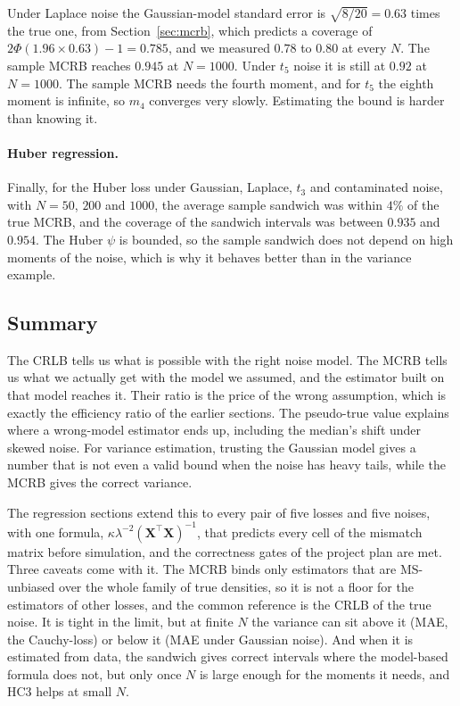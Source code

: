 \documentclass[11pt]{article}
\numberwithin{figure}{section}
\numberwithin{equation}{section}
\begin{document}
Under Laplace noise the Gaussian-model standard error is $\sqrt{8/20} = 0.63$ times the true one, from
Section~\ref{sec:mcrb}, which predicts a coverage of $2\Phi(1.96\times0.63) - 1 = 0.785$, and we measured
$0.78$ to $0.80$ at every $N$. The sample MCRB reaches $0.945$ at $N = 1000$. Under $t_5$ noise it is still at
$0.92$ at $N = 1000$. The sample MCRB needs the fourth moment, and for $t_5$ the eighth moment is infinite, so
$m_4$ converges very slowly. Estimating the bound is harder than knowing it.

\paragraph{Huber regression.} Finally, for the Huber loss under Gaussian, Laplace, $t_3$ and contaminated
noise, with $N = 50$, $200$ and $1000$, the average sample sandwich was within $4\%$ of the true MCRB, and the
coverage of the sandwich intervals was between $0.935$ and $0.954$. The Huber $\psi$ is bounded, so the
sample sandwich does not depend on high moments of the noise, which is why it behaves better than in the
variance example.

\subsection{Summary}

The CRLB tells us what is possible with the right noise model. The MCRB tells us what we actually
get with the model we assumed, and the estimator built on that model reaches it. Their ratio is the
price of the wrong assumption, which is exactly the efficiency ratio of the earlier sections. The
pseudo-true value explains where a wrong-model estimator ends up, including the median's shift under
skewed noise. For variance estimation, trusting the Gaussian model gives a number that is not even a
valid bound when the noise has heavy tails, while the MCRB gives the correct variance.

The regression sections extend this to every pair of five losses and five noises, with one formula,
$\kappa\lambda^{-2}(\mathbf{X}^\top\mathbf{X})^{-1}$, that predicts every cell of the mismatch matrix before simulation, and the
correctness gates of the project plan are met. Three caveats come with it. The MCRB binds only
estimators that are MS-unbiased over the whole family of true densities, so it is not a floor for the
estimators of other losses, and the common reference is the CRLB of the true noise. It is tight in the
limit, but at finite $N$ the variance can sit above it (MAE, the Cauchy-loss) or below it (MAE under Gaussian
noise). And when it is estimated from data, the sandwich gives correct intervals where the model-based
formula does not, but only once $N$ is large enough for the moments it needs, and HC3 helps at small $N$.
\end{document}

